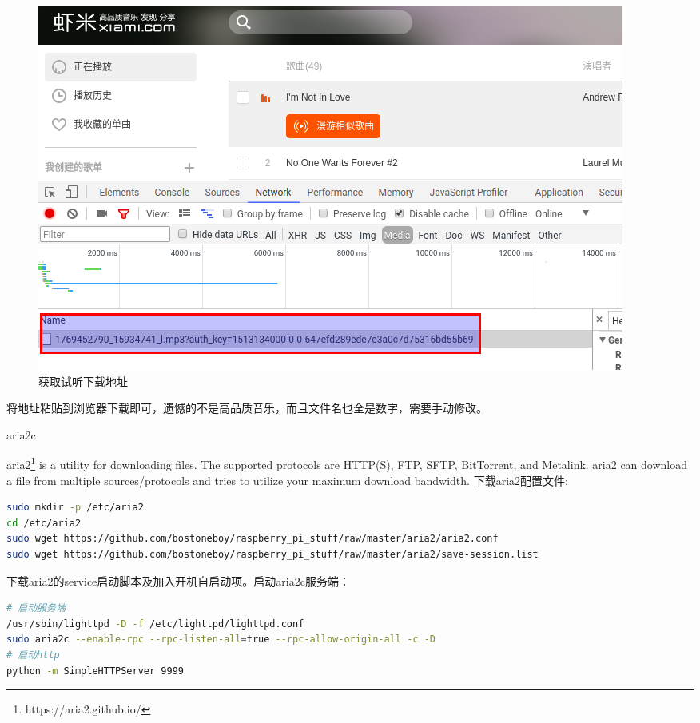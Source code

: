 \documentclass[12pt]{book}
\makeatletter
\numberwithin{dummy}{section}
\theoremstyle{ocrenumbox}
\theoremstyle{blacknumex}
\theoremstyle{blacknumbox}
\theoremstyle{ocrenum}
\renewcommand{\subsection}{\@startsection {subsection}{2}{\z@}
	{-3ex \@plus -0.1ex \@minus -.4ex}
	{0.5ex \@plus.2ex }
	{\normalfont\sffamily\bfseries}}
\makeatother
\begin{document}
\begin{figure}[htbp]
	\centering
	\includegraphics[scale=0.5]{scratchxiamidownloadurl.png}
	\caption{获取试听下载地址}
	\label{fig:scratchxiamidownloadurl}
\end{figure}

将地址粘贴到浏览器下载即可，遗憾的不是高品质音乐，而且文件名也全是数字，需要手动修改。

\subsection{aria2c}

aria2\footnote{https://aria2.github.io/} is a utility for downloading files. The supported protocols are HTTP(S), FTP, SFTP, BitTorrent, and Metalink. aria2 can download a file from multiple sources/protocols and tries to utilize your maximum download bandwidth. 下载aria2配置文件:

\begin{lstlisting}[language=Bash]
sudo mkdir -p /etc/aria2
cd /etc/aria2
sudo wget https://github.com/bostoneboy/raspberry_pi_stuff/raw/master/aria2/aria2.conf
sudo wget https://github.com/bostoneboy/raspberry_pi_stuff/raw/master/aria2/save-session.list
\end{lstlisting}

下载aria2的service启动脚本及加入开机自启动项。启动aria2c服务端：

\begin{lstlisting}[language=Bash]
# 启动服务端
/usr/sbin/lighttpd -D -f /etc/lighttpd/lighttpd.conf
sudo aria2c --enable-rpc --rpc-listen-all=true --rpc-allow-origin-all -c -D
# 启动http
python -m SimpleHTTPServer 9999
\end{lstlisting}
\end{document}
